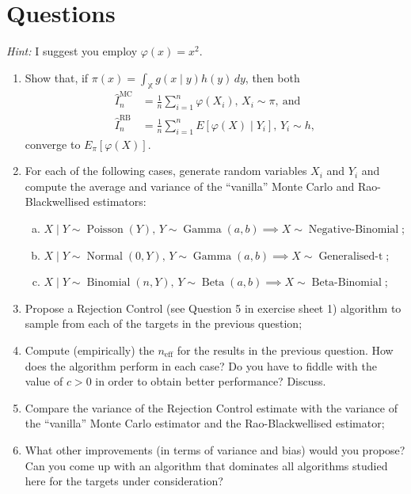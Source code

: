 \documentclass[a4paper,10pt, notitlepage]{report}
\begin{document}
\section*{Questions}
\textit{Hint:} I suggest you employ $\varphi(x) = x^2$.
\begin{enumerate}
 \item Show that, if $\pi(x) = \int_{\mathbb{X}} g(x\mid y) h(y)\,dy$, then both
 \begin{align*}
 \hat{I}_n^{\text{MC}} &= \frac{1}{n} \sum_{i=1}^n \varphi(X_i), \, X_i \sim \pi, \: \text{and}\\
 \hat{I}_n^{\text{RB}} &= \frac{1}{n} \sum_{i=1}^n E[\varphi(X) \mid Y_i] , \, Y_i \sim h, 
 \end{align*}
converge to $E_\pi[\varphi(X)]$.
\item For each of the following cases, generate random variables $X_i$ and $Y_i$ and compute the average and variance of the ``vanilla'' Monte Carlo and Rao-Blackwellised estimators:
\begin{enumerate}[(a)]
 \item $X\mid Y \sim \operatorname{Poisson}(Y),\, Y \sim \operatorname{Gamma}(a, b) \implies X \sim \operatorname{Negative-Binomial}$;
  \item $X\mid Y \sim \operatorname{Normal}(0, Y),\, Y \sim \operatorname{Gamma}(a, b) \implies X \sim \operatorname{Generalised-t}$;
   \item $X\mid Y \sim \operatorname{Binomial}(n, Y),\, Y \sim \operatorname{Beta}(a, b) \implies X \sim \operatorname{Beta-Binomial}$;
 \end{enumerate}
 
 \item Propose a Rejection Control (see Question 5 in exercise sheet 1) algorithm to sample from each of the targets in the previous question;
 \item Compute (empirically) the $n_{\text{eff}}$ for the results in the previous question.
 How does the algorithm perform in each case? 
 Do you have to fiddle with the value of $c >0$ in order to obtain better performance?
 Discuss.
 \item Compare the variance of the Rejection Control estimate with the variance of the ``vanilla'' Monte Carlo estimator and the Rao-Blackwellised  estimator;
 \item What other improvements (in terms of variance and bias) would you propose?
 Can you come up with an algorithm that dominates all algorithms studied here for the targets under consideration?
\end{enumerate}

% 
% 
% 
\end{document}
